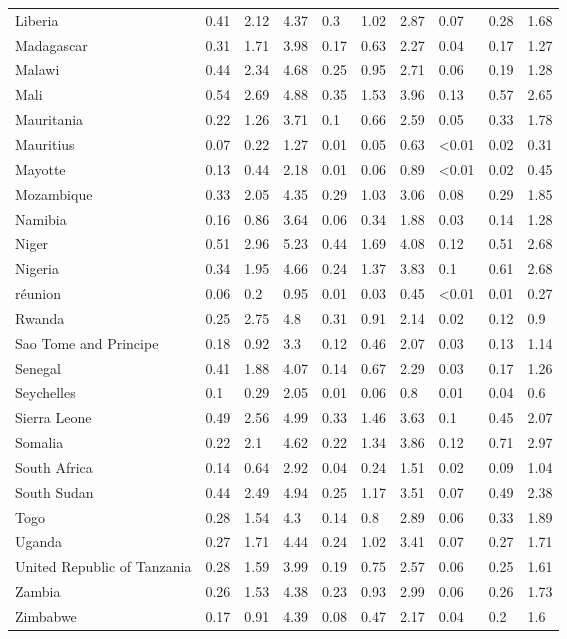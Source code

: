 \begin{longtable}[t]{llllllllll}
Liberia & 0.41 & 2.12 & 4.37 & 0.3 & 1.02 & 2.87 & 0.07 & 0.28 & 1.68\\
\addlinespace
Madagascar & 0.31 & 1.71 & 3.98 & 0.17 & 0.63 & 2.27 & 0.04 & 0.17 & 1.27\\
Malawi & 0.44 & 2.34 & 4.68 & 0.25 & 0.95 & 2.71 & 0.06 & 0.19 & 1.28\\
Mali & 0.54 & 2.69 & 4.88 & 0.35 & 1.53 & 3.96 & 0.13 & 0.57 & 2.65\\
Mauritania & 0.22 & 1.26 & 3.71 & 0.1 & 0.66 & 2.59 & 0.05 & 0.33 & 1.78\\
Mauritius & 0.07 & 0.22 & 1.27 & 0.01 & 0.05 & 0.63 & <0.01 & 0.02 & 0.31\\
\addlinespace
Mayotte & 0.13 & 0.44 & 2.18 & 0.01 & 0.06 & 0.89 & <0.01 & 0.02 & 0.45\\
Mozambique & 0.33 & 2.05 & 4.35 & 0.29 & 1.03 & 3.06 & 0.08 & 0.29 & 1.85\\
Namibia & 0.16 & 0.86 & 3.64 & 0.06 & 0.34 & 1.88 & 0.03 & 0.14 & 1.28\\
Niger & 0.51 & 2.96 & 5.23 & 0.44 & 1.69 & 4.08 & 0.12 & 0.51 & 2.68\\
Nigeria & 0.34 & 1.95 & 4.66 & 0.24 & 1.37 & 3.83 & 0.1 & 0.61 & 2.68\\
\addlinespace
réunion & 0.06 & 0.2 & 0.95 & 0.01 & 0.03 & 0.45 & <0.01 & 0.01 & 0.27\\
Rwanda & 0.25 & 2.75 & 4.8 & 0.31 & 0.91 & 2.14 & 0.02 & 0.12 & 0.9\\
Sao Tome and Principe & 0.18 & 0.92 & 3.3 & 0.12 & 0.46 & 2.07 & 0.03 & 0.13 & 1.14\\
Senegal & 0.41 & 1.88 & 4.07 & 0.14 & 0.67 & 2.29 & 0.03 & 0.17 & 1.26\\
Seychelles & 0.1 & 0.29 & 2.05 & 0.01 & 0.06 & 0.8 & 0.01 & 0.04 & 0.6\\
\addlinespace
Sierra Leone & 0.49 & 2.56 & 4.99 & 0.33 & 1.46 & 3.63 & 0.1 & 0.45 & 2.07\\
Somalia & 0.22 & 2.1 & 4.62 & 0.22 & 1.34 & 3.86 & 0.12 & 0.71 & 2.97\\
South Africa & 0.14 & 0.64 & 2.92 & 0.04 & 0.24 & 1.51 & 0.02 & 0.09 & 1.04\\
South Sudan & 0.44 & 2.49 & 4.94 & 0.25 & 1.17 & 3.51 & 0.07 & 0.49 & 2.38\\
Togo & 0.28 & 1.54 & 4.3 & 0.14 & 0.8 & 2.89 & 0.06 & 0.33 & 1.89\\
\addlinespace
Uganda & 0.27 & 1.71 & 4.44 & 0.24 & 1.02 & 3.41 & 0.07 & 0.27 & 1.71\\
United Republic of Tanzania & 0.28 & 1.59 & 3.99 & 0.19 & 0.75 & 2.57 & 0.06 & 0.25 & 1.61\\
Zambia & 0.26 & 1.53 & 4.38 & 0.23 & 0.93 & 2.99 & 0.06 & 0.26 & 1.73\\
Zimbabwe & 0.17 & 0.91 & 4.39 & 0.08 & 0.47 & 2.17 & 0.04 & 0.2 & 1.6\\*
\end{longtable}
\endgroup{}
